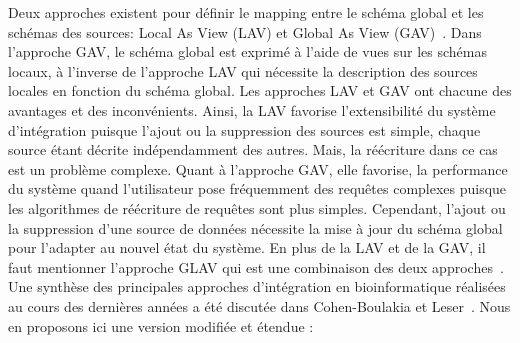 Deux approches existent pour définir le mapping entre le schéma global et les schémas des sources: Local As View (LAV) et Global As View (GAV)~\cite{Halevy2001}. Dans l’approche GAV, le schéma global est exprimé à l’aide de vues sur les schémas locaux, à l’inverse de l’approche LAV qui nécessite la description des sources locales en fonction du schéma global. Les approches LAV et GAV ont chacune des avantages et des inconvénients. Ainsi, la  LAV   favorise l’extensibilité   du   système   d’intégration   puisque   l’ajout   ou   la   suppression   des   sources   est   simple,   chaque source   étant   décrite   indépendamment   des   autres.   Mais,  la   réécriture   dans   ce   cas   est   un   problème complexe.   Quant   à   l’approche   GAV,   elle   favorise,   la   performance   du   système   quand   l’utilisateur pose fréquemment  des   requêtes   complexes  puisque   les   algorithmes   de   réécriture   de   requêtes   sont   plus   simples. Cependant, l’ajout ou la suppression d’une source de données nécessite la mise à jour du schéma global pour l’adapter au nouvel état du système. En plus de la LAV et de la GAV, il faut mentionner l’approche GLAV qui est une combinaison des deux approches~\cite{lenzerini2002}.\\


Une synthèse des principales approches d'intégration en bioinformatique réalisées au cours des dernières années a été discutée dans Cohen-Boulakia et Leser~\cite{cohen2010}. Nous en proposons ici une version modifiée et étendue :\\

